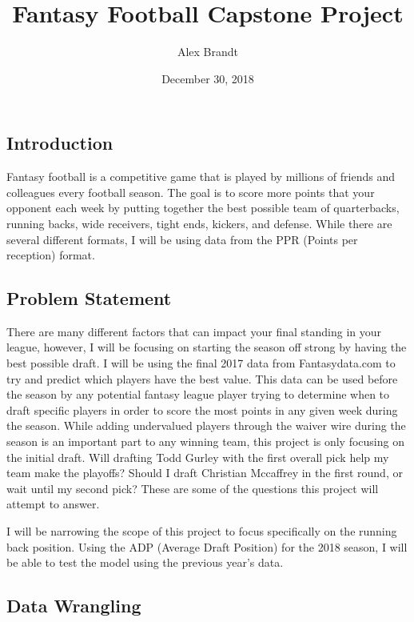 \documentclass[]{article}
\title{Fantasy Football Capstone Project}
\author{Alex Brandt}
\date{December 30, 2018}
\begin{document}
\maketitle

\subsection{Introduction}\label{introduction}

Fantasy football is a competitive game that is played by millions of
friends and colleagues every football season. The goal is to score more
points that your opponent each week by putting together the best
possible team of quarterbacks, running backs, wide receivers, tight
ends, kickers, and defense. While there are several different formats, I
will be using data from the PPR (Points per reception) format.

\subsection{Problem Statement}\label{problem-statement}

There are many different factors that can impact your final standing in
your league, however, I will be focusing on starting the season off
strong by having the best possible draft. I will be using the final 2017
data from Fantasydata.com to try and predict which players have the best
value. This data can be used before the season by any potential fantasy
league player trying to determine when to draft specific players in
order to score the most points in any given week during the season.
While adding undervalued players through the waiver wire during the
season is an important part to any winning team, this project is only
focusing on the initial draft. Will drafting Todd Gurley with the first
overall pick help my team make the playoffs? Should I draft Christian
Mccaffrey in the first round, or wait until my second pick? These are
some of the questions this project will attempt to answer.

I will be narrowing the scope of this project to focus specifically on
the running back position. Using the ADP (Average Draft Position) for
the 2018 season, I will be able to test the model using the previous
year's data.

\subsection{Data Wrangling}\label{data-wrangling}
\end{document}
